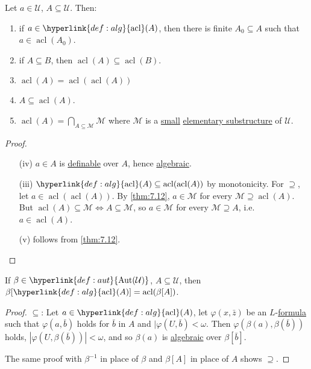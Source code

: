 \documentclass{article}
\DeclareMathOperator{\Aut}{Aut}
\DeclareMathOperator{\acl}{acl}
\begin{document}
\begin{nprop}\label{prop:7.13}
  Let $a \in \mathcal{U}$, $A \subseteq \mathcal{U}$. Then:
  \begin{enumerate}[label=(\roman*)]
    \item if $a \in \hyperlink{def:alg}{\acl}(A)$, then there is finite $A_0 \subseteq A$ such that $a \in \acl(A_0)$.
    \item if $A \subseteq B$, then $\acl(A) \subseteq \acl(B)$.
    \item $\acl(A) = \acl(\acl(A))$
    \item $A \subseteq \acl(A)$.
    \item $\acl(A) = \bigcap_{A \subseteq \mathcal{M}} \mathcal{M}$
      where $\mathcal{M}$ is a \hyperlink{def:small}{small} \hyperlink{def:elsubs}{elementary substructure} of $\mathcal{U}$.
  \end{enumerate}
\end{nprop}
\begin{proof}\leavevmode
  \begin{enumerate}[label=(\roman*)]
    \item[(iv)] $a \in A$ is \hyperlink{def:def}{definable} over $A$, hence \hyperlink{def:alg}{algebraic}.
    \item[(iii)] $\hyperlink{def:alg}{\acl}(A) \subseteq \acl(\acl(A))$ by monotonicity.
      For $\supseteq$, let $a \in \acl(\acl(A))$. By \cref{thm:7.12}, $a \in \mathcal{M}$ for every $\mathcal{M} \supseteq \acl(A)$.
      But $\acl(A) \subseteq \mathcal{M} \iff A \subseteq \mathcal{M}$, so $a \in \mathcal{M}$ for every $\mathcal{M} \supseteq A$, i.e.\ $a \in \acl(A)$.
      \item[(v)] follows from \cref{thm:7.12}. \qedhere
  \end{enumerate}
\end{proof}
\begin{nprop}\label{prop:7.14}
  If $\beta\in \hyperlink{def:aut}{\Aut(\mathcal{U})}$, $A \subseteq \mathcal{U}$, then $\beta[\hyperlink{def:alg}{\acl}(A)] = \acl(\beta[A])$.
\end{nprop}
\begin{proof}
  $\subseteq$: Let $a \in \hyperlink{def:alg}{\acl}(A)$, let $\varphi(x, \bar{z})$ be an $L$-\hyperlink{def:form}{formula} such that $\varphi(a, \bar{b})$ holds for $\bar{b}$ in $A$ and $|\varphi(U, \bar{b}) < \omega$.
  Then $\varphi(\beta(a), \beta(\bar{b}))$ holds, $|\varphi(U, \beta(\bar{b}))|<\omega$, and so $\beta(a)$ is \hyperlink{def:alg}{algebraic} over $\beta[\bar{b}]$.

  The same proof with $\beta^{-1}$ in place of $\beta$ and $\beta[A]$ in place of $A$ shows $\supseteq$.
\end{proof}
\end{document}
